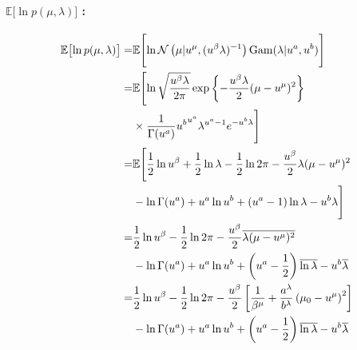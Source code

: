 \paragraph{$\mathbb{E}\bigl[\ln p( \mu, \lambda) \bigr]$ : }
\begin{align}
  \mathbb{E}\bigl[\ln p( \mu, \lambda) \bigr]  =&  \mathbb{E}\Biggl[ \ln  \mathcal{N}\left(\mu | u^\mu, (u^\beta \lambda)^{-1}\right) {\rm Gam}(\lambda | u^a, u^b)  \Biggr]  \\
%
    =&  \mathbb{E}\Biggl[ \ln  \sqrt{\frac{u^\beta \lambda}{2\pi}} \exp\left\{-\frac{u^\beta \lambda}{2} (\mu - u^\mu)^2 \right\}  \notag  \\  
      &  \times  \frac{1}{\Gamma(u^a)} {u^b}^{u^a} {\lambda}^{u^a - 1} e^{- u^b \lambda} \Biggr]  \\
%
  =&  \mathbb{E}\Biggl[  
      \frac{1}{2} \ln u^\beta + \frac{1}{2} \ln \lambda - \frac{1}{2} \ln 2 \pi  - \frac{u^\beta}{2} \lambda (\mu - u^\mu)^2  \notag  \\  
    &  - \ln \Gamma(u^a) + u^a \ln u^b  + \left(u^a - 1\right) \ln \lambda - u^b \lambda  
    \Biggr]  \\
%
  =&  \frac{1}{2} \ln u^\beta - \frac{1}{2} \ln 2 \pi - \frac{u^\beta}{2} \overline{\lambda (\mu - u^\mu)^2}  \notag  \\  
    &  - \ln \Gamma(u^a) + u^a \ln u^b + \left(u^a - \frac{1}{2}\right) \overline{\ln \lambda} - u^b \overline{\lambda}  \\ 
%
  =&  \frac{1}{2} \ln u^\beta - \frac{1}{2} \ln 2 \pi - \frac{u^\beta}{2} \left[ \frac{1}{\beta^\mu} + \frac{a^\lambda}{b^\lambda} \left( \mu_{0} - u^\mu \right)^2 \right]  \notag  \\  
    &  - \ln \Gamma(u^a) + u^a \ln u^b  + \left(u^a - \frac{1}{2}\right) \overline{\ln \lambda} - u^b \overline{\lambda}  
\end{align}

